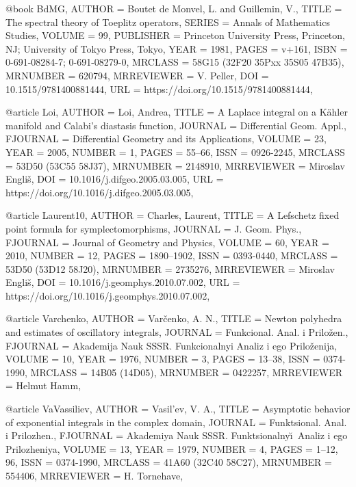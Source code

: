 @book {BdMG,
    AUTHOR = {Boutet de Monvel, L. and Guillemin, V.},
     TITLE = {The spectral theory of {T}oeplitz operators},
    SERIES = {Annals of Mathematics Studies},
    VOLUME = {99},
 PUBLISHER = {Princeton University Press, Princeton, NJ; University of Tokyo
              Press, Tokyo},
      YEAR = {1981},
     PAGES = {v+161},
      ISBN = {0-691-08284-7; 0-691-08279-0},
   MRCLASS = {58G15 (32F20 35Pxx 35S05 47B35)},
  MRNUMBER = {620794},
MRREVIEWER = {V. Peller},
       DOI = {10.1515/9781400881444},
       URL = {https://doi.org/10.1515/9781400881444},
}

@article {Loi,
    AUTHOR = {Loi, Andrea},
     TITLE = {A {L}aplace integral on a {K}\"ahler manifold and {C}alabi's
              diastasis function},
   JOURNAL = {Differential Geom. Appl.},
  FJOURNAL = {Differential Geometry and its Applications},
    VOLUME = {23},
      YEAR = {2005},
    NUMBER = {1},
     PAGES = {55--66},
      ISSN = {0926-2245},
   MRCLASS = {53D50 (53C55 58J37)},
  MRNUMBER = {2148910},
MRREVIEWER = {Miroslav Engli\v s},
       DOI = {10.1016/j.difgeo.2005.03.005},
       URL = {https://doi.org/10.1016/j.difgeo.2005.03.005},
}

@article {Laurent10,
    AUTHOR = {Charles, Laurent},
     TITLE = {A {L}efschetz fixed point formula for symplectomorphisms},
   JOURNAL = {J. Geom. Phys.},
  FJOURNAL = {Journal of Geometry and Physics},
    VOLUME = {60},
      YEAR = {2010},
    NUMBER = {12},
     PAGES = {1890--1902},
      ISSN = {0393-0440},
   MRCLASS = {53D50 (53D12 58J20)},
  MRNUMBER = {2735276},
MRREVIEWER = {Miroslav Engli\v s},
       DOI = {10.1016/j.geomphys.2010.07.002},
       URL = {https://doi.org/10.1016/j.geomphys.2010.07.002},
}


@article {Varchenko,
    AUTHOR = {Var\v cenko, A. N.},
     TITLE = {Newton polyhedra and estimates of oscillatory integrals},
   JOURNAL = {Funkcional. Anal. i Prilo\v zen.},
  FJOURNAL = {Akademija Nauk SSSR. Funkcional\cprime nyi Analiz i ego Prilo\v zenija},
    VOLUME = {10},
      YEAR = {1976},
    NUMBER = {3},
     PAGES = {13--38},
      ISSN = {0374-1990},
   MRCLASS = {14B05 (14D05)},
  MRNUMBER = {0422257},
MRREVIEWER = {Helmut Hamm},
}

@article {VaVassiliev,
    AUTHOR = {Vasil'ev, V. A.},
     TITLE = {Asymptotic behavior of exponential integrals in the complex
              domain},
   JOURNAL = {Funktsional. Anal. i Prilozhen.},
  FJOURNAL = {Akademiya Nauk SSSR. Funktsional\cprime ny\u\i \ Analiz i ego
              Prilozheniya},
    VOLUME = {13},
      YEAR = {1979},
    NUMBER = {4},
     PAGES = {1--12, 96},
      ISSN = {0374-1990},
   MRCLASS = {41A60 (32C40 58C27)},
  MRNUMBER = {554406},
MRREVIEWER = {H. Tornehave},
}

